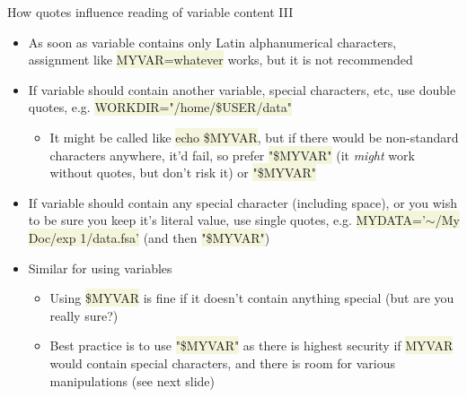 \documentclass[compress, ucs, xelatex, 11pt, xcolor=svgnames, aspectratio=169,
	hyperref={
		bookmarks=true,
		unicode=true,
		colorlinks=true,
		pdftitle={Linux, command line and MetaCentrum},
		plainpages=false,
		pdfauthor={Vojtech Zeisek},
		pdfsubject={Course about use of Linux command line, writing shell scripts and using MetaCentrum of CESNET},
		pdfcreator={XeLaTeX},
		pdfkeywords={Linux, GNU, BASH, shell, command line, MetaCentrum},
		linkcolor=DarkRed, %
		anchorcolor=DarkBlue, %
		citecolor=Indigo, %
		filecolor=NavyBlue, %
		menucolor=DarkMagenta, %
		urlcolor=DarkBlue, %
		pdftex},
	url={hyphens, lowtilde} %
	]{beamer}
\renewcommand{\texttt}[1]{\colorbox{Beige}{{\ttfamily #1}}}
\begin{document}
\begin{frame}{How quotes influence reading of variable content III}
	\begin{itemize}
		\item As soon as variable contains only Latin alphanumerical characters, assignment like \texttt{MYVAR=whatever} works, but it is not recommended
		\item If variable should contain another variable, special characters, etc, use double quotes, e.g. \texttt{WORKDIR="/home/\$USER/data"}
		\begin{itemize}
		 \item It might be called like \texttt{echo \$MYVAR}, but if there would be non-standard characters anywhere, it'd fail, so prefer \texttt{"\$MYVAR"} (it \textit{might} work without quotes, but don't risk it) or \texttt{"\$\textbraceleft MYVAR\textbraceright"}
		\end{itemize}
		\item If variable should contain any special character (including space), or you wish to be sure you keep it's literal value, use single quotes, e.g. \texttt{MYDATA='$\sim$/My Doc/exp 1/data.fsa'} (and then \texttt{"\$MYVAR"})
		\item Similar for using variables
		\begin{itemize}
			\item Using \texttt{\$MYVAR} is fine if it doesn't contain anything special (but are you really sure?)
			\item Best practice is to use \texttt{"\$\textbraceleft MYVAR\textbraceright"} as there is highest security if \texttt{MYVAR} would contain special characters, and there is room for various manipulations (see next slide)
		\end{itemize}
	\end{itemize}
\end{frame}
\end{document}
